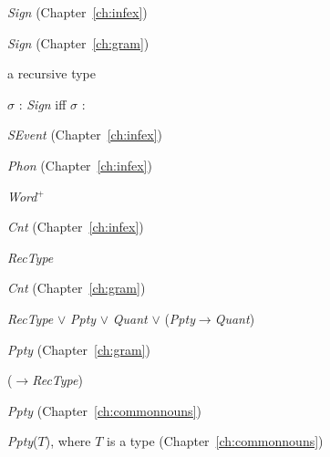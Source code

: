 \textit{Sign} (Chapter~\ref{ch:infex})


\textit{Sign} (Chapter~\ref{ch:gram})

a recursive type

$\sigma$ : \textit{Sign} iff $\sigma$ : 

\textit{SEvent} (Chapter~\ref{ch:infex})


\textit{Phon} (Chapter~\ref{ch:infex})

\textit{Word}$^+$

\textit{Cnt} (Chapter~\ref{ch:infex})

\textit{RecType}

\textit{Cnt} (Chapter~\ref{ch:gram})

\textit{RecType} $\vee$ \textit{Ppty} $\vee$ \textit{Quant} $\vee$ (\textit{Ppty}$\rightarrow$\textit{Quant})

\textit{Ppty} (Chapter~\ref{ch:gram})

($\rightarrow$\textit{RecType})

\textit{Ppty} (Chapter~\ref{ch:commonnouns})


\textit{Ppty}($T$), where $T$ is a type (Chapter~\ref{ch:commonnouns})


